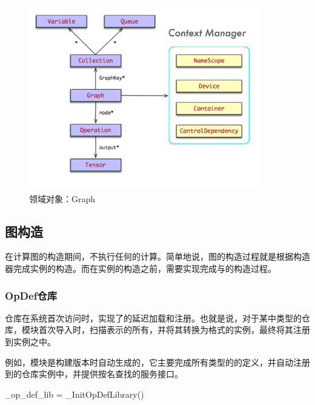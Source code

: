 \begin{content}
\begin{figure}[!htbp]
\centering
\includegraphics[width=0.9\textwidth]{figures/py-graph.png}
\caption{领域对象：Graph}
 \label{fig:py-graph}
\end{figure}

\subsection{图构造}

在计算图的构造期间，不执行任何的计算。简单地说，图的构造过程就是根据构造器完成实例的构造。而在实例的构造之前，需要实现完成与的构造过程。

\subsubsection{OpDef仓库}

仓库在系统首次访问时，实现了的延迟加载和注册。也就是说，对于某中类型的仓库，模块首次导入时，扫描表示的所有，并将其转换为格式的实例，最终将其注册到实例之中。

例如，模块是构建版本时自动生成的，它主要完成所有类型的的定义，并自动注册到的仓库实例中，并提供按名查找的服务接口。

\begin{leftbar}
\begin{python}
_op_def_lib = _InitOpDefLibrary()


\end{python}
\end{leftbar}
\end{content}
